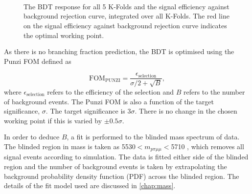 \begin{figure}[!t]\def\nh{0.3\textwidth}
  \centering



   \textwidth
   \\
  \textwidth
     \\
   \textwidth
  \\


 \caption{The BDT response for all 5 K-Folds and the signal efficiency against background rejection curve, integrated over all K-Folds. The red line on the signal efficiency against background rejection curve indicates the optimal working point.}
  \label{Fig:kfoldBDT}

\end{figure}


As there is no branching fraction prediction, the BDT is optimised using the Punzi \gls{FOM} \cite{Punzi:2003bu} defined as

\begin{equation}
  \mathrm{FOM}_{\mathrm{PUNZI}} = \frac{\epsilon_{\mathrm{selection}}}{\sigma/2  + \sqrt{B}},
  \label{eq:punz}
\end{equation}
where $\epsilon_{\mathrm{selection}}$ refers to the efficiency of the selection and $B$ refers to the number of background events.
The Punzi FOM is also a function of the target significance, $\sigma$. The target significance is 3$\sigma$. There is no change in the chosen working point if this is varied by $\pm0.5\sigma$. %

In order to deduce $B$, a fit is performed to the blinded mass spectrum of \Lbpi data. The blinded region in mass is taken as 5530$<m_{p\pi\mu\mu}<$5710 \mevcc, which removes all signal events according to simulation. The data is fitted either side of the blinded region and the number of background events is taken by extrapolating the background probability density function (PDF) across the blinded region. The details of the fit model used are discussed in \autoref{chap:mass}.

